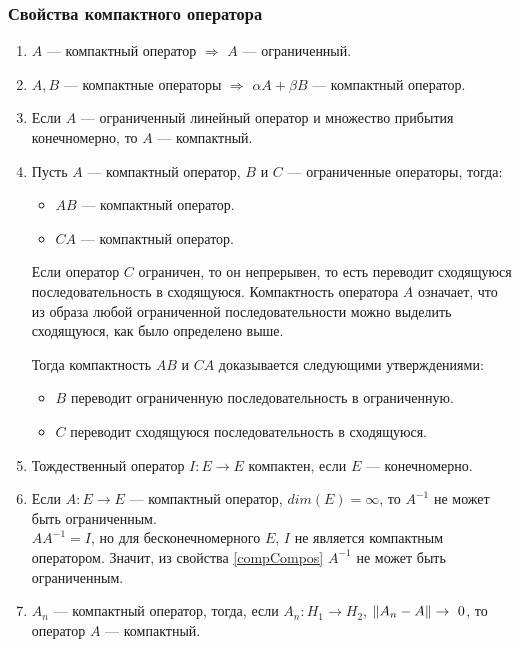 \documentclass[12pt]{article}
\begin{document}
	\subsubsection{Свойства компактного оператора}
	\begin{enumerate}
		\item $A$ --- компактный оператор $\Rightarrow$ $A$ --- ограниченный.		
		\item $A, B$ --- компактные операторы $\Rightarrow$ $\alpha A + \beta B$ --- компактный оператор.		
		\item Если $A$ --- ограниченный линейный оператор и множество прибытия конечномерно, то $A$ --- компактный. \label{compArea}
		\item Пусть $A$ --- компактный оператор, $B$ и $C$ --- ограниченные операторы, тогда: \label{compCompos}
			\begin{itemize}
				\item $AB$ --- компактный оператор.
				\item $CA$ --- компактный оператор.
			\end{itemize}
		
			Если оператор $C$ ограничен, то он непрерывен, то есть переводит сходящуюся последовательность 
			в сходящуюся. Компактность оператора $A$ означает, что из образа любой ограниченной 
			последовательности можно выделить сходящуюся, как было определено выше.
		
			Тогда компактность $AB$ и $CA$ доказывается следующими утверждениями:
			\begin{itemize}
				\item $B$ переводит ограниченную последовательность в ограниченную.
				\item $C$ переводит сходящуюся последовательность в сходящуюся.
			\end{itemize}		
		\item Тождественный оператор $I:E\rightarrow E$ компактен, если $E$ --- конечномерно.
		\item Если $A:E \rightarrow E$ --- компактный оператор, $dim(E) = \infty$, то $A^{-1}$ не может быть ограниченным. \\

			$A A^{-1} = I$, но для бесконечномерного $E$, $I$ не является компактным оператором. Значит, 
			из свойства \ref{compCompos} $A^{-1}$ не может быть ограниченным.
		\item $A_n$ --- компактный оператор, тогда, если $A_n:H_1 \rightarrow H_2$, $\left\| A_n - A \right\| \rightarrow~0$, то 
		оператор $A$ --- компактный. \label{compLim}
		

\end{enumerate}
\end{document}
